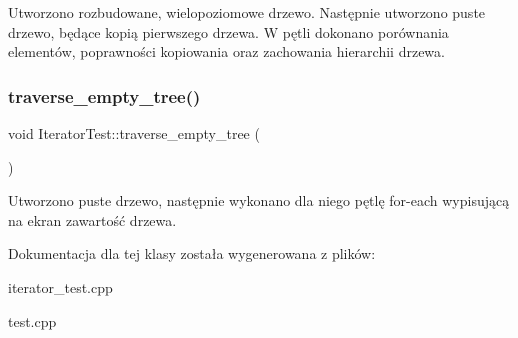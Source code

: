 Utworzono rozbudowane, wielopoziomowe drzewo. Następnie utworzono puste drzewo, będące kopią pierwszego drzewa. W pętli dokonano porównania elementów, poprawności kopiowania oraz zachowania hierarchii drzewa. \mbox{\label{class_iterator_test_a4b9f01849936bbe2fb2d8307b13a8a24}} 
\subsubsection{\texorpdfstring{traverse\+\_\+empty\+\_\+tree()}{traverse\_empty\_tree()}}
{\footnotesize\ttfamily void Iterator\+Test\+::traverse\+\_\+empty\+\_\+tree (\begin{DoxyParamCaption}{ }\end{DoxyParamCaption})\hspace{0.3cm}{\ttfamily [inline]}}

Utworzono puste drzewo, następnie wykonano dla niego pętlę for-\/each wypisującą na ekran zawartość drzewa. 

Dokumentacja dla tej klasy została wygenerowana z plików\+:\begin{DoxyCompactItemize}
\item 
iterator\+\_\+test.\+cpp\item 
test.\+cpp\end{DoxyCompactItemize}

